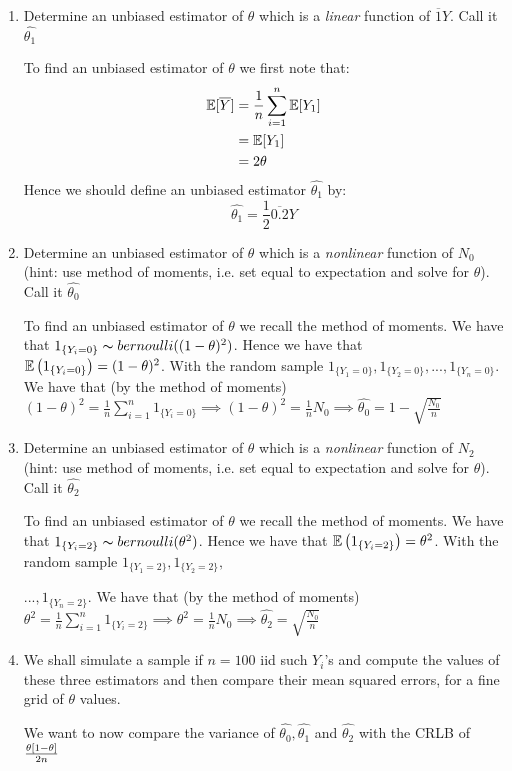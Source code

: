 \documentclass[12pt, a4paper]{article}\usepackage[]{graphicx}\usepackage[]{color}
\begin{document}
\begin{enumerate}[label={\bfseries\arabic*.}]
\item Determine an unbiased estimator of $\theta$ which is a \textit{linear} function of $\overbar{1}{Y}$. Call it $\hat{\theta_1}$

{\setlength{\leftskip}{3ex}

To find an unbiased estimator of $\theta$ we first note that:
\begin{align*}
\E[\overbar{0.5}{Y}] & = \frac{1}{n}\sum_{i = 1}^n\E[Y_1]\\
& = \E[Y_1] \\
& = 2\theta
\end{align*}
Hence we should define an unbiased estimator $\hat{\theta_1}$ by: 
$$\hat{\theta_1} = \frac{1}{2}\overbar{0.2}{Y}$$
}
\item Determine an unbiased estimator of $\theta$ which is a \textit{nonlinear} function of $N_0$ (hint: use method of moments, i.e. set equal to expectation and solve for $\theta$). Call it $\hat{\theta_0}$

{\setlength{\leftskip}{3ex}

To find an unbiased estimator of $\theta$ we recall the method of moments. We have that $1_{\{Y_i = 0\}} \thicksim bernoulli((1 - \theta)^2)$. Hence we have that $\operatorname{\mathbb{E}}\left(1_{\{Y_i = 0\}}\right) = (1 - \theta)^2$. With the random sample $1_{\{Y_1 = 0\}}, 1_{\{Y_2 = 0\}}, ..., 1_{\{Y_n = 0\}}$. We have that (by the method of moments) $ (1 - \theta)^2 = \frac{1}{n}\sum_{i = 1}^n 1_{\{Y_i = 0\}} \implies (1 - \theta)^2 = \frac{1}{n}N_0 \implies \hat{\theta_0} = 1 - \sqrt{\frac{N_0}{n}}$

}

\item Determine an unbiased estimator of $\theta$ which is a \textit{nonlinear} function of $N_2$ (hint: use method of moments, i.e. set equal to expectation and solve for $\theta$). Call it $\hat{\theta_2}$

{\setlength{\leftskip}{3ex}

To find an unbiased estimator of $\theta$ we recall the method of moments. We have that $1_{\{Y_i = 2\}} \thicksim bernoulli(\theta^2)$. Hence we have that $\operatorname{\mathbb{E}}\left(1_{\{Y_i = 2\}}\right) =\theta^2$. With the random sample $1_{\{Y_1 = 2\}}, 1_{\{Y_2 = 2\}},$ 

$..., 1_{\{Y_n = 2\}}$. We have that (by the method of moments) $ \theta^2 = \frac{1}{n}\sum_{i = 1}^n 1_{\{Y_i = 2\}} \implies \theta^2 = \frac{1}{n}N_0 \implies \hat{\theta_2} = \sqrt{\frac{N_0}{n}}$

}

\item We shall simulate a sample if $n = 100$ iid such $Y_i$’s and compute the values of these three estimators and then compare their mean squared errors, for a fine grid of $\theta$ values.

{\setlength{\leftskip}{3ex}

We want to now compare the variance of $\hat{\theta_0}, \hat{\theta_1}$ and $\hat{\theta_2}$ with the CRLB of $\frac{\theta\left[1 - \theta\right]}{2n}$

}
\end{enumerate}
\end{document}

